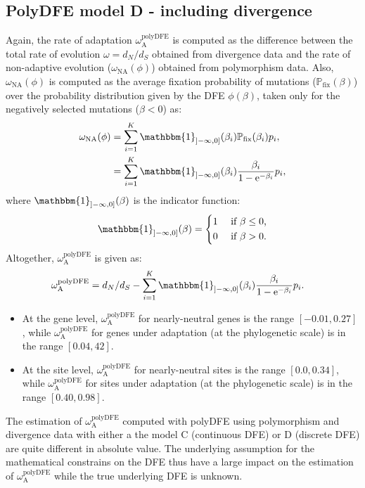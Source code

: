 \documentclass{article}
\newcommand{\e}{\mathrm{e}}
\newcommand{\dn}{d_N}
\newcommand{\ds}{d_S}
\newcommand{\dnds}{\dn / \ds}
\newcommand{\rateApop}{\omega_{\mathrm{A}}}
\newcommand{\proba}{\mathbb{P}}
\newcommand{\pfix}{\proba_{\mathrm{fix}}}
\newcommand{\Spop}{\beta}
\begin{document}
    \subsection{PolyDFE model D - including divergence}
    Again, the rate of adaptation $\rateApop^{\mathrm{polyDFE}}$ is computed as the difference between the total rate of evolution $\omega=\dnds$ obtained from divergence data and the rate of non-adaptive evolution ($\omega_{\mathrm{NA}}(\phi)$) obtained from polymorphism data.
    Also, $\omega_{\mathrm{NA}}(\phi)$ is computed as the average fixation probability of mutations ($\pfix (\Spop)$) over the probability distribution given by the DFE $\phi (\Spop)$, taken only for the negatively selected mutations ($\Spop < 0$) as:
    \begin{align}
        \omega_{\mathrm{NA}}(\phi) &= \sum_{i=1}^{K} \mathbbm{1}_{]-\infty, 0]}(\Spop_i) \pfix (\Spop_i) p_i,  \\
        &= \sum_{i=1}^{K} \mathbbm{1}_{]-\infty, 0]}(\Spop_i) \frac{\Spop_i}{1 - \e^{-\Spop_i}} p_i,
    \end{align}
    where $\mathbbm{1}_{]-\infty, 0]}(\Spop)$ is the indicator function:
    \begin{equation}
        \mathbbm{1}_{]-\infty, 0]}(\Spop) =
        \begin{dcases}
            1 & \text{ if $\Spop \leq 0$,} \\
            0 & \text{ if $\Spop > 0$.} \\
        \end{dcases}
    \end{equation}
    Altogether, $\rateApop^{\mathrm{polyDFE}}$ is given as:
    \begin{align}
        \rateApop^{\mathrm{polyDFE}} &= \dnds - \sum_{i=1}^{K} \mathbbm{1}_{]-\infty, 0]}(\Spop_i) \frac{\Spop_i}{1 - \e^{-\Spop_i}} p_i.
    \end{align}
    \newpage
    

    \begin{itemize}
        \item At the gene level, $\rateApop^{\mathrm{polyDFE}}$ for nearly-neutral genes is the range $[-0.01,0.27]$, while $\rateApop^{\mathrm{polyDFE}}$ for genes under adaptation (at the phylogenetic scale) is in the range $[0.04,42]$.
        \item At the site level, $\rateApop^{\mathrm{polyDFE}}$ for nearly-neutral sites is the range $[0.0,0.34]$, while $\rateApop^{\mathrm{polyDFE}}$ for sites under adaptation (at the phylogenetic scale) is in the range $[0.40,0.98]$.
    \end{itemize}
    The estimation of $\rateApop^{\mathrm{polyDFE}}$ computed with polyDFE using polymorphism and divergence data with either a the model C (continuous DFE) or D (discrete DFE) are quite different in absolute value.
    The underlying assumption for the mathematical constrains on the DFE thus have a large impact on the estimation of $\rateApop^{\mathrm{polyDFE}}$ while the true underlying DFE is unknown.

    \pagebreak

    \printbibliography
\end{document}
